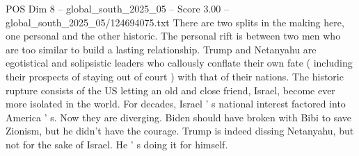 \begin{textsample}{POS Dim 8 – global\_south\_2025\_05 – Score 3.00 – global\_south\_2025\_05/124694075.txt}
There are two splits in the making here, one personal and the other historic.
The personal rift is between two men who are too similar to build a lasting relationship.
Trump and Netanyahu are egotistical and solipsistic leaders who callously conflate their own fate ( including their prospects of staying out of court ) with that of their nations.
The historic rupture consists of the US letting an old and close friend, Israel, become ever more isolated in the world.
For decades, Israel ' s national interest factored into America ' s.
Now they are diverging.
Biden should have broken with Bibi to save Zionism, but he didn't have the courage.
Trump is indeed dissing Netanyahu, but not for the sake of Israel.
He ' s doing it for himself.

\end{textsample}
